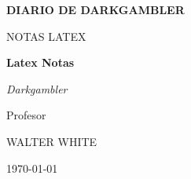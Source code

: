 \begin{titlepage}
	\centering
	
	{\scshape\LARGE \textbf{DIARIO DE DARKGAMBLER} \par}
	\vspace{1cm}
	{\scshape\Large NOTAS LATEX\par}
	\vspace{1.5cm}
	{\huge\bfseries \textcolor{azulSection}{Latex Notas}\par}
	\vspace{2cm}
	       {\Large\itshape Darkgambler\par}
	\vfill
	Profesor\par
	WALTER WHITE

	\vfill

	{\large \today\par}
\end{titlepage}
